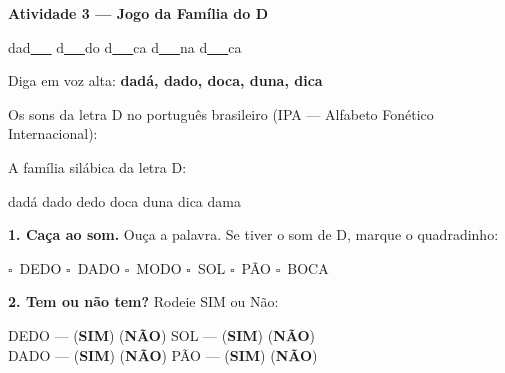 \begin{consolidacao}
\textbf{Atividade 3 --- Jogo da Fam\'ilia do D}


\begin{center}
dad\underline{~~~} \quad d\underline{~~~}do \quad d\underline{~~~}ca \quad d\underline{~~~}na \quad d\underline{~~~}ca
\end{center}
Diga em voz alta: \textbf{dad\'a, dado, doca, duna, dica}

\end{consolidacao}


\begin{sonsdaletra}
Os sons da letra D no portugu\^es{} brasileiro (IPA --- Alfabeto Fon\'etico Internacional):

\end{sonsdaletra}


\begin{familiasilabica}
A fam\'ilia sil\'abica da letra D:

\begin{center}
dad\'a \quad dado \quad dedo \quad doca \quad duna \quad dica \quad dama
\end{center}
\end{familiasilabica}


\begin{somletra}
\textbf{1. Ca\c{c}a ao som.} Ou\c{c}a a palavra. Se tiver o som de D, marque o quadradinho:
\begin{center}
$\square$~DEDO \quad $\square$~DADO \quad $\square$~MODO \quad $\square$~SOL \quad $\square$~P\~AO \quad $\square$~BOCA
\end{center}

\textbf{2. Tem ou n\~ao{} tem?} Rodeie SIM ou N\~ao:
\begin{center}
DEDO --- (\textbf{SIM}) (\textbf{N\~AO}) \quad SOL --- (\textbf{SIM}) (\textbf{N\~AO}) \\ DADO --- (\textbf{SIM}) (\textbf{N\~AO}) \quad P\~AO --- (\textbf{SIM}) (\textbf{N\~AO})
\end{center}
\end{somletra}

